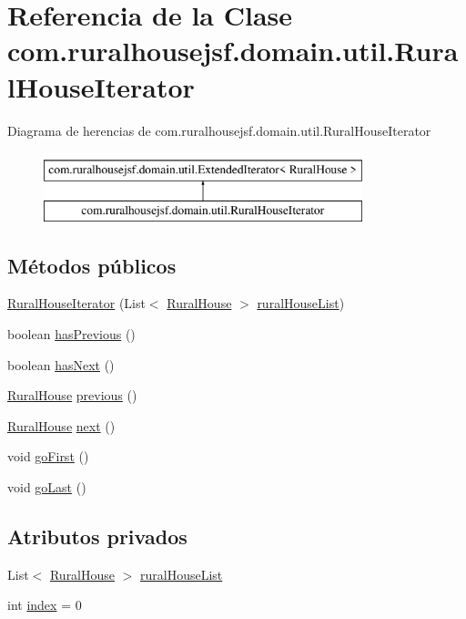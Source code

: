 \hypertarget{a00200}{}\section{Referencia de la Clase com.\+ruralhousejsf.\+domain.\+util.\+Rural\+House\+Iterator}
\label{a00200}
Diagrama de herencias de com.\+ruralhousejsf.\+domain.\+util.\+Rural\+House\+Iterator\begin{figure}[H]
\begin{center}
\leavevmode
\includegraphics[height=2.000000cm]{a00200}
\end{center}
\end{figure}
\subsection*{Métodos públicos}
\begin{DoxyCompactItemize}
\item 
\mbox{\hyperlink{a00200_aa0a65be50d1149a49a37203d411279d3}{Rural\+House\+Iterator}} (List$<$ \mbox{\hyperlink{a00188}{Rural\+House}} $>$ \mbox{\hyperlink{a00200_a86506cdc509d2a232309bdcf939f4d51}{rural\+House\+List}})
\item 
boolean \mbox{\hyperlink{a00200_a90b778a08dfc34d566860a169a3001b9}{has\+Previous}} ()
\item 
boolean \mbox{\hyperlink{a00200_a9c16d216cbe652522d6c903294938eda}{has\+Next}} ()
\item 
\mbox{\hyperlink{a00188}{Rural\+House}} \mbox{\hyperlink{a00200_af8df4b4ec1f3a626dbda91cf23daeb08}{previous}} ()
\item 
\mbox{\hyperlink{a00188}{Rural\+House}} \mbox{\hyperlink{a00200_ad3bcb60befad58cc8bd1377459ae729b}{next}} ()
\item 
void \mbox{\hyperlink{a00200_a843246b6edfb1409f7fe9afc1215bc31}{go\+First}} ()
\item 
void \mbox{\hyperlink{a00200_a58fe2a76236f3578ff3eb7f22b14bc5c}{go\+Last}} ()
\end{DoxyCompactItemize}
\subsection*{Atributos privados}
\begin{DoxyCompactItemize}
\item 
List$<$ \mbox{\hyperlink{a00188}{Rural\+House}} $>$ \mbox{\hyperlink{a00200_a86506cdc509d2a232309bdcf939f4d51}{rural\+House\+List}}
\item 
int \mbox{\hyperlink{a00200_a834745c64bea24644840222751eb901a}{index}} = 0
\end{DoxyCompactItemize}


